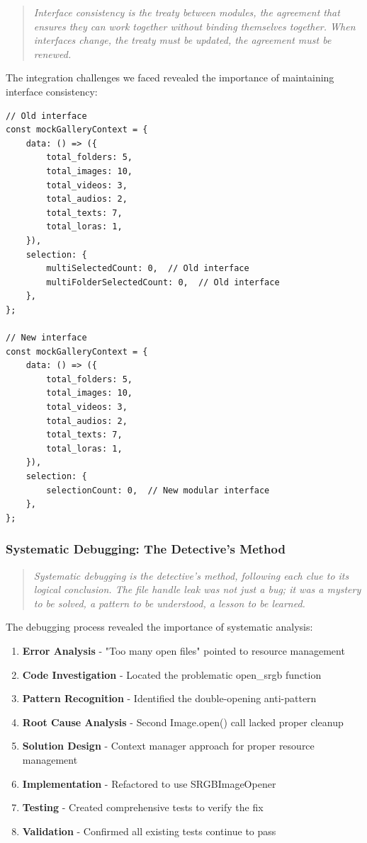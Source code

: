 \documentclass[11pt]{article}
\begin{document}
\begin{quote}
\emph{Interface consistency is the treaty between modules, the agreement that ensures they can work together without binding themselves together. When interfaces change, the treaty must be updated, the agreement must be renewed.}
\end{quote}

The integration challenges we faced revealed the importance of maintaining interface consistency:

\begin{lstlisting}[style=typescript]
// Old interface
const mockGalleryContext = {
    data: () => ({
        total_folders: 5,
        total_images: 10,
        total_videos: 3,
        total_audios: 2,
        total_texts: 7,
        total_loras: 1,
    }),
    selection: {
        multiSelectedCount: 0,  // Old interface
        multiFolderSelectedCount: 0,  // Old interface
    },
};

// New interface
const mockGalleryContext = {
    data: () => ({
        total_folders: 5,
        total_images: 10,
        total_videos: 3,
        total_audios: 2,
        total_texts: 7,
        total_loras: 1,
    }),
    selection: {
        selectionCount: 0,  // New modular interface
    },
};
\end{lstlisting}

\subsubsection{Systematic Debugging: The Detective's Method}

\begin{quote}
\emph{Systematic debugging is the detective's method, following each clue to its logical conclusion. The file handle leak was not just a bug; it was a mystery to be solved, a pattern to be understood, a lesson to be learned.}
\end{quote}

The debugging process revealed the importance of systematic analysis:

\begin{enumerate}
\item \textbf{Error Analysis} - "Too many open files" pointed to resource management
\item \textbf{Code Investigation} - Located the problematic open\_srgb function
\item \textbf{Pattern Recognition} - Identified the double-opening anti-pattern
\item \textbf{Root Cause Analysis} - Second Image.open() call lacked proper cleanup
\item \textbf{Solution Design} - Context manager approach for proper resource management
\item \textbf{Implementation} - Refactored to use SRGBImageOpener
\item \textbf{Testing} - Created comprehensive tests to verify the fix
\item \textbf{Validation} - Confirmed all existing tests continue to pass
\end{enumerate}
\end{document}
